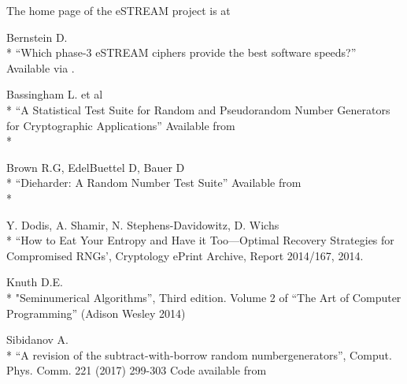 \documentclass[letterpaper,12pt]{article}
\begin{document}
\begin{thebibliography}{99}
\begin{samepage}
  The home page of the eSTREAM project is at\newline
\end{samepage}

\begin{samepage}
  Bernstein D.\\*
  ``Which phase-3 eSTREAM ciphers provide the best software speeds?''
    Available via .
\end{samepage}

  Bassingham L. et al\\*
  ``A Statistical Test Suite for Random and Pseudorandom Number Generators
  for Cryptographic Applications''
  Available from\\*

  Brown R.G, EdelBuettel D, Bauer D\\*
  ``Dieharder: A Random Number Test Suite''
  Available from\\*
  
\begin{samepage}
  Y. Dodis, A. Shamir, N. Stephens-Davidowitz, D. Wichs\\*
  ``How to Eat Your Entropy and Have it Too---Optimal Recovery Strategies for
  Compromised RNGs',
  Cryptology ePrint Archive, Report 2014/167, 2014.
\end{samepage}

\begin{samepage}
  Knuth D.E.\\*
  "Seminumerical Algorithms'', Third edition. Volume 2 of ``The Art of Computer
  Programming''
  (Adison Wesley 2014)
\end{samepage}

  Sibidanov A.\\*
  ``A revision of the subtract-with-borrow random numbergenerators'',
  Comput. Phys. Comm. 221 (2017) 299-303
  Code available from 


\end{thebibliography}
\end{document}
